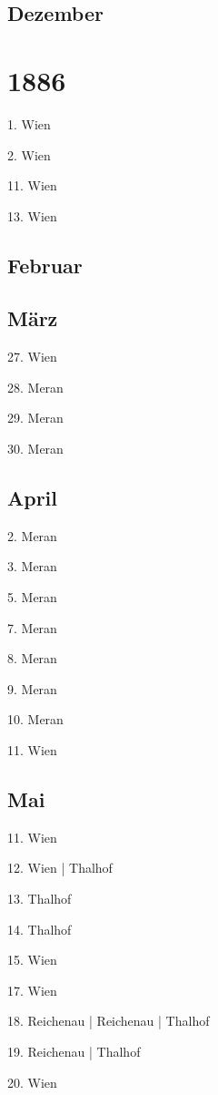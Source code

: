 \documentclass[twoside=false,titlepage=false,open=any, parskip=never, fontsize=10pt, headings=small, chapterprefix=false, appendixprefix=false, DIV=15]{scrbook}
\begin{document}
\begin{multicols}{3}
            \section*{Dezember}
            \chapter*{1886}
            1. Wien\par
            2. Wien\par
            11. Wien\par
            13. Wien\par
            \section*{Februar}
            \section*{März}
            27. Wien\par
            28. Meran\par
            29. Meran\par
            30. Meran\par
            \section*{April}
            2. Meran\par
            3. Meran\par
            5. Meran\par
            7. Meran\par
            8. Meran\par
            9. Meran\par
            10. Meran\par
            11. Wien\par
            \section*{Mai}
            11. Wien\par
            12. Wien | Thalhof\par
            13. Thalhof\par
            14. Thalhof\par
            15. Wien\par
            17. Wien\par
            18. Reichenau | Reichenau | Thalhof\par
            19. Reichenau | Thalhof\par
            20. Wien\par

\end{multicols}
\end{document}
